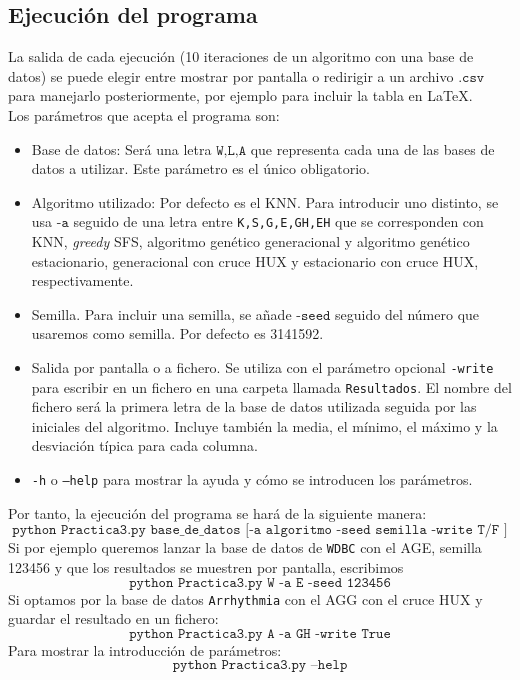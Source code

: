 \documentclass[11pt,leqno]{article}
\begin{document}
\subsection{Ejecución del programa}
La salida de cada ejecución (10 iteraciones de un algoritmo con una base de datos) se puede elegir entre mostrar por pantalla o redirigir a un archivo $\texttt{.csv}$ para manejarlo posteriormente, por ejemplo para incluir la tabla en \LaTeX.\\
Los parámetros que acepta el programa son:
\begin{itemize}
\item Base de datos: Será una letra $\texttt{W,L,A}$ que representa cada una de las bases de datos a utilizar. Este parámetro es el único obligatorio.
\item Algoritmo utilizado: Por defecto es el KNN. Para introducir uno distinto, se usa $\texttt{-a}$ seguido de una letra entre \texttt{K,S,G,E,GH,EH} que se corresponden con KNN, \textit{greedy} SFS, algoritmo genético generacional y algoritmo genético estacionario, generacional con cruce HUX y estacionario con cruce HUX, respectivamente.
\item Semilla. Para incluir una semilla, se añade $\texttt{-seed}$ seguido del número que usaremos como semilla. Por defecto es 3141592.
\item Salida por pantalla o a fichero. Se utiliza con el parámetro opcional \texttt{-write} para escribir en un fichero en una carpeta llamada \texttt{Resultados}. El nombre del fichero será la primera letra de la base de datos utilizada seguida por las iniciales del algoritmo. Incluye también la media, el mínimo, el máximo y la desviación típica para cada columna.
\item \texttt{-h} o \texttt{--help} para mostrar la ayuda y cómo se introducen los parámetros.
\end{itemize}

Por tanto, la ejecución del programa se hará de la siguiente manera:
\[ \texttt{python Practica3.py base\_de\_datos [-a algoritmo -seed semilla -write T/F ]} \]
Si por ejemplo queremos lanzar la base de datos de \texttt{WDBC} con el AGE, semilla 123456 y que los resultados se muestren por pantalla, escribimos
\[ \texttt{python Practica3.py W -a E -seed 123456}\]
Si optamos por la base de datos \texttt{Arrhythmia} con el AGG con el cruce HUX y guardar el resultado en un fichero:
\[ \texttt{python Practica3.py A -a GH -write True}\]
Para mostrar la introducción de parámetros:
\[ \texttt{python Practica3.py --help}\]
\end{document}
